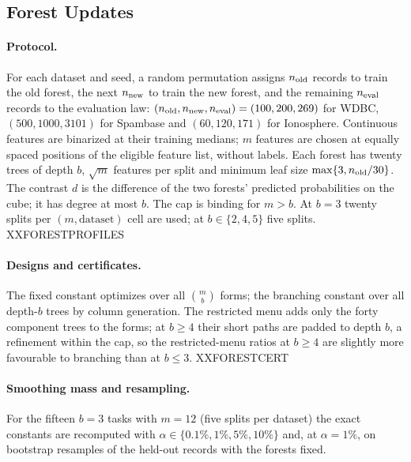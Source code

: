 \subsection{Forest Updates}\label{app:forestexact}
\paragraph{Protocol.}
For each dataset and seed, a random permutation assigns $n_{\rm old}$ records to train the old forest, the next $n_{\rm new}$ to train the new forest, and the remaining $n_{\rm eval}$ records to the evaluation law: $(n_{\rm old},n_{\rm new},n_{\rm eval})=(100,200,269)$ for WDBC, $(500,1000,3101)$ for Spambase and $(60,120,171)$ for Ionosphere. Continuous features are binarized at their training medians; $m$ features are chosen at equally spaced positions of the eligible feature list, without labels. Each forest has twenty trees of depth $b$, $\sqrt m$ features per split and minimum leaf size $\max\{3,n_{\rm old}/30\}$. The contrast $d$ is the difference of the two forests' predicted probabilities on the cube; it has degree at most $b$. The cap is binding for $m>b$. At $b=3$ twenty splits per $(m,\text{dataset})$ cell are used; at $b\in\{2,4,5\}$ five splits. XXFORESTPROFILES

\paragraph{Designs and certificates.}
The fixed constant optimizes over all $\binom mb$ forms; the branching constant over all depth-$b$ trees by column generation. The restricted menu adds only the forty component trees to the forms; at $b\ge4$ their short paths are padded to depth $b$, a refinement within the cap, so the restricted-menu ratios at $b\ge4$ are slightly more favourable to branching than at $b\le3$. XXFORESTCERT




\paragraph{Smoothing mass and resampling.}
For the fifteen $b=3$ tasks with $m=12$ (five splits per dataset) the exact constants are recomputed with $\alpha\in\{0.1\%,1\%,5\%,10\%\}$ and, at $\alpha=1\%$, on bootstrap resamples of the held-out records with the forests fixed.


